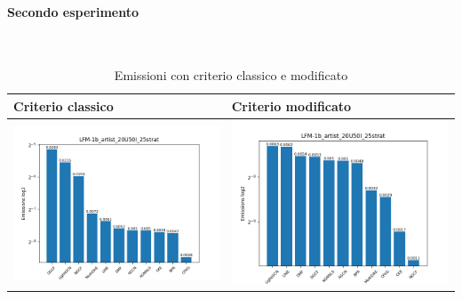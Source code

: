 \paragraph{Secondo esperimento} \textcolor{white}{.} \\
\begin{table}[H]
    \centering
    \footnotesize
    \setlength\tabcolsep{0pt}
    \begin{tabularx}{\textwidth}{|X|X|}
        \hline
        \textbf{Criterio classico} & \textbf{Criterio modificato} \\
        \hline
        \includegraphics[width=\linewidth, trim=0 0 0 0]{images/emissions_LFM-1b_artist_20U50I_25strat_earlyClassic.png} &
        \includegraphics[width=\linewidth, trim=0 0 0 0]{images/emissions_LFM-1b_artist_20U50I_25strat_earlyModified.png} \\
        \hline
    \end{tabularx}
    \caption{Emissioni con criterio classico e modificato}
    \label{tab:emissions_info}
\end{table}



